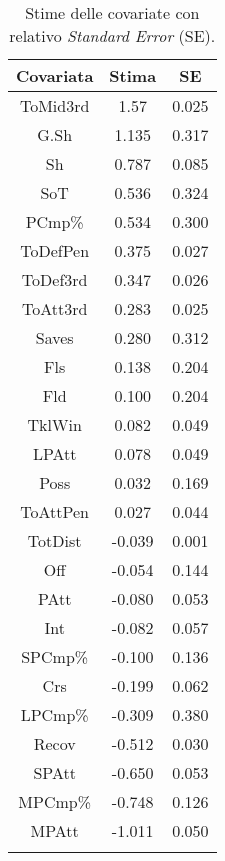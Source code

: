 \begin{table}[]%
	
	\renewcommand{\arraystretch}{1.7}
	\centering
	\begin{tabular}{c c c }
		\hline	
		
		\textbf{Covariata} & \textbf{Stima} & \textbf{SE} \\	
		\hline
		ToMid3rd & 1.57 & 0.025\\
		G.Sh & 1.135 & 0.317 \\
		Sh & 0.787 & 0.085 \\  
		SoT &  0.536 & 0.324 \\  
		PCmp\% & 0.534 & 0.300 \\
		ToDefPen & 0.375 & 0.027 \\      
		ToDef3rd & 0.347 & 0.026 \\
		ToAtt3rd & 0.283 & 0.025 \\     	     	 
		Saves & 0.280 & 0.312 \\ 
		Fls & 0.138 & 0.204  \\     
		Fld & 0.100 & 0.204  \\
		TklWin &  0.082 & 0.049  \\    
		LPAtt & 0.078 & 0.049  \\ 		
		Poss & 0.032 & 0.169 \\ 
		ToAttPen & 0.027 & 0.044 \\  
		TotDist & -0.039 & 0.001 \\  	
		Off & -0.054 & 0.144  \\
		PAtt & -0.080 & 0.053 \\ 
		Int & -0.082 & 0.057 \\  
		SPCmp\% & -0.100 & 0.136 \\ 
		Crs & -0.199 & 0.062\\  
		LPCmp\% & -0.309 & 0.380 \\ 
		Recov &  -0.512 & 0.030 \\        
		SPAtt & -0.650 & 0.053 \\     
		MPCmp\% & -0.748 & 0.126 \\
		MPAtt & -1.011 & 0.050 \\     		     		   		    
		\hline
		& &  \\
		
	\end{tabular} \hbox{}
\caption{Stime delle covariate con relativo \emph{Standard 
		Error} (SE).} \label{tab:BTC2} 
     
\end{table}

